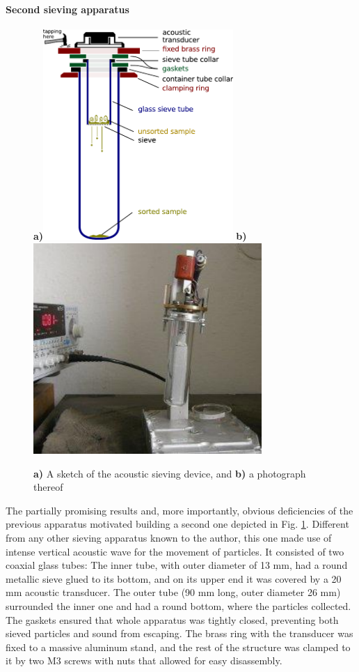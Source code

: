 \paragraph{Second sieving apparatus}
\begin{figure}[ht] \caption{\textbf{a)} A sketch of the acoustic sieving device, and \textbf{b)} a photograph thereof} \label{fg_sieving2} \centering 
\textbf{a)}\includegraphics[height=8cm]{img/technology/sieve2_sieving_scheme.pdf}
\textbf{b)}\includegraphics[height=8cm]{img/technology/sieving_m.pdf}
\end{figure}
The partially promising results and, more importantly, obvious deficiencies of the previous apparatus motivated building a second one depicted in Fig. \ref{fg_sieving2}.
Different from any other sieving apparatus known to the author, this one made use of intense vertical acoustic wave for the movement of particles. It consisted of two coaxial glass tubes: The inner tube, with outer diameter of 13 mm, had a round metallic sieve glued to its bottom, and on its upper end it was covered by a 20 mm acoustic transducer. The outer tube (90 mm long, outer diameter 26 mm) surrounded the inner one and had a round bottom, where the particles collected. 
The gaskets ensured that whole apparatus was tightly closed, preventing both sieved particles and sound from escaping. The brass ring with the transducer was fixed to a massive aluminum stand, and the rest of the structure was clamped to it by two M3 screws with nuts that allowed for easy disassembly. 


